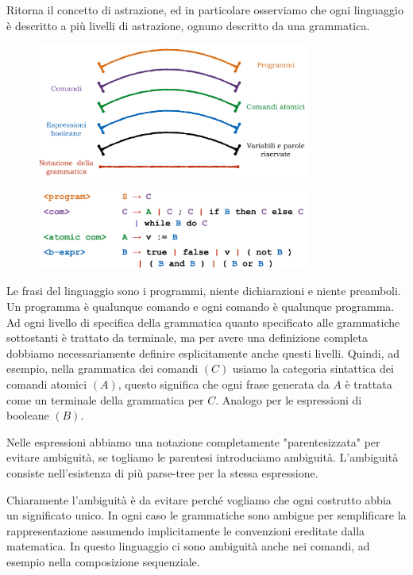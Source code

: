 \documentclass[oneside,a4paper,11pt]{book}
\theoremstyle{italicstyle}
\theoremstyle{normStyle}
\begin{document}
Ritorna il concetto di astrazione, ed in particolare osserviamo che ogni 
linguaggio è descritto a più livelli di astrazione, ognuno descritto da una 
grammatica.
\begin{figure}[H]
  \centering
  \includegraphics[width=9cm]{img/imperativo.jpeg}
  \label{fig:esempiolingimperativo}
\end{figure}
\begin{figure}[H]
  \centering
  \includegraphics[width=9cm]{img/linguaggioEx.jpeg}
  \label{fig:linguaggioEx}
\end{figure}
Le frasi del linguaggio sono i programmi, niente dichiarazioni 
e niente preamboli. Un programma è qualunque comando e ogni comando è 
qualunque programma. Ad ogni livello di specifica della grammatica 
quanto specificato alle grammatiche sottostanti è trattato da terminale, ma per 
avere una definizione completa dobbiamo necessariamente definire esplicitamente 
anche questi livelli. Quindi, ad esempio, nella grammatica dei comandi $(C)$ 
usiamo la categoria sintattica dei comandi atomici $(A)$, questo significa 
che ogni frase generata da $A$ è trattata come un terminale della grammatica 
per $C$.
Analogo per le espressioni di booleane $(B)$.

Nelle espressioni abbiamo una notazione completamente "parentesizzata" 
per evitare ambiguità, se togliamo le parentesi introduciamo ambiguità.
L'ambiguità consiste nell'esistenza di più parse-tree per la stessa espressione.

Chiaramente l'ambiguità è da evitare perché vogliamo che ogni costrutto abbia 
un significato unico. In ogni caso le grammatiche sono ambigue per semplificare la 
rappresentazione assumendo implicitamente le convenzioni ereditate dalla matematica.
In questo linguaggio ci sono ambiguità anche nei comandi, ad esempio nella composizione sequenziale.
\end{document}
